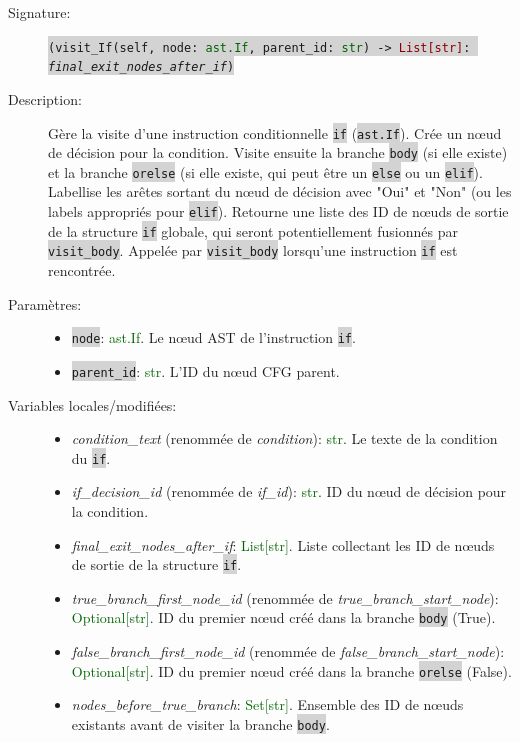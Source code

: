 \documentclass[11pt,a4paper]{article}
\newcommand{\code}[1]{\colorbox{lightgray}{\texttt{\small #1}}}
\newcommand{\var}[1]{\textit{#1}}
\newcommand{\vartype}[1]{\textcolor{darkgreen}{#1}}
\newcommand{\param}[1]{\code{#1}}
\newcommand{\rettype}[1]{\textcolor{darkred}{#1}}
\begin{document}
\begin{description}
    \item[Signature:] \code{(visit\_If(self, node: \vartype{ast.If}, parent\_id: \vartype{str}) -> \rettype{List[str]}: \var{final\_exit\_nodes\_after\_if})}
    \item[Description:] Gère la visite d'une instruction conditionnelle \code{if} (\code{ast.If}). Crée un nœud de décision pour la condition. Visite ensuite la branche \code{body} (si elle existe) et la branche \code{orelse} (si elle existe, qui peut être un \code{else} ou un \code{elif}). Labellise les arêtes sortant du nœud de décision avec "Oui" et "Non" (ou les labels appropriés pour \code{elif}). Retourne une liste des ID de nœuds de sortie de la structure \code{if} globale, qui seront potentiellement fusionnés par \code{visit\_body}. Appelée par \code{visit\_body} lorsqu'une instruction \code{if} est rencontrée.
    \item[Paramètres:]
    \begin{itemize}
        \item \param{node}: \vartype{ast.If}. Le nœud AST de l'instruction \code{if}.
        \item \param{parent\_id}: \vartype{str}. L'ID du nœud CFG parent.
    \end{itemize}
    \item[Variables locales/modifiées:]
    \begin{itemize}
        \item \var{condition\_text} (renommée de \var{condition}): \vartype{str}. Le texte de la condition du \code{if}.
        \item \var{if\_decision\_id} (renommée de \var{if\_id}): \vartype{str}. ID du nœud de décision pour la condition.
        \item \var{final\_exit\_nodes\_after\_if}: \vartype{List[str]}. Liste collectant les ID de nœuds de sortie de la structure \code{if}.
        \item \var{true\_branch\_first\_node\_id} (renommée de \var{true\_branch\_start\_node}): \vartype{Optional[str]}. ID du premier nœud créé dans la branche \code{body} (True).
        \item \var{false\_branch\_first\_node\_id} (renommée de \var{false\_branch\_start\_node}): \vartype{Optional[str]}. ID du premier nœud créé dans la branche \code{orelse} (False).
        \item \var{nodes\_before\_true\_branch}: \vartype{Set[str]}. Ensemble des ID de nœuds existants avant de visiter la branche \code{body}.

\end{itemize}
\end{description}
\end{document}
